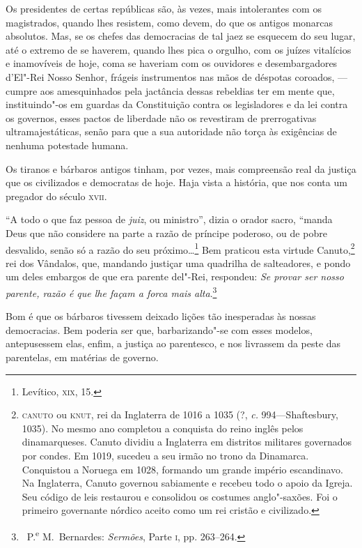 Os presidentes de certas repúblicas são, às vezes, mais
intolerantes com os magistrados, quando lhes resistem, como devem, do
que os antigos monarcas absolutos. Mas, se os chefes das democracias de
tal jaez se esquecem do seu lugar, até o extremo de se haverem, quando
lhes pica o orgulho, com os juízes vitalícios e inamovíveis de hoje,
coma se haveriam com os ouvidores e desembargadores
d'El"-Rei Nosso Senhor, frágeis instrumentos nas mãos
de déspotas coroados, --- cumpre aos amesquinhados pela jactância dessas
rebeldias ter em mente que, instituindo"-os em guardas da Constituição
contra os legisladores e da lei contra os governos, esses pactos de
liberdade não os revestiram de prerrogativas ultramajestáticas, senão
para que a sua autoridade não torça às exigências de nenhuma potestade
humana.

Os tiranos e bárbaros antigos tinham, por vezes, mais compreensão
real da justiça que os civilizados e democratas de hoje. Haja vista a
história, que nos conta um pregador do século \textsc{xvii}.

``A todo o que faz pessoa de \textit{juiz}, ou
ministro'', dizia o orador sacro, ``manda
Deus que não considere na parte a razão de príncipe poderoso, ou de
pobre desvalido, senão só a razão do seu próximo\ldots{}\footnote{ Levítico,
\textsc{xix}, 15.} Bem praticou esta virtude Canuto,\footnote{ \textsc{canuto} ou
\textsc{knut}, rei da Inglaterra de 1016 a 1035 (?, \textit{c.} 994---Shaftesbury, 1035). 
No mesmo ano completou a conquista do reino inglês pelos dinamarqueses.
Canuto dividiu a Inglaterra em distritos militares governados por
condes. Em 1019, sucedeu a seu irmão no trono da Dinamarca. Conquistou
a Noruega em 1028, formando um grande império escandinavo. Na
Inglaterra, Canuto governou sabiamente e recebeu todo o apoio da
Igreja. Seu código de leis restaurou e consolidou os costumes
anglo"-saxões. Foi o primeiro governante nórdico aceito como um rei
cristão e civilizado.} rei dos Vândalos, que, mandando
justiçar uma quadrilha de salteadores, e pondo um deles embargos de que
era parente del"-Rei, respondeu: \textit{Se provar ser nosso parente,
razão é que lhe façam a forca mais alta}.\footnote{\ P.\textsuperscript{e} 
M.~Bernardes: \textit{Sermões}, Parte \textsc{i}, pp. 263--264.}

Bom é que os bárbaros tivessem deixado lições tão inesperadas às
nossas democracias. Bem poderia ser que, barbarizando"-se com esses
modelos, antepusessem elas, enfim, a justiça ao parentesco, e nos
livrassem da peste das parentelas, em matérias de governo.

